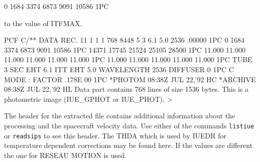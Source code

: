 \documentclass[11pt,twoside,nolof,noabs]{starlink}
\begin{document}
\begin{terminalv}
           0       1684       3374       6873       9091      10586   1PC
\end{terminalv}
to the value of ITFMAX.
\begin{terminalv}
 PCF C/** DATA REC. 11 1   1   1 768 8448 5 3  6.1  5.0 2536   .00000 1PC
           0       1684       3374       6873       9091      10586   1PC
       14371      17745      21524      25105      28500              1PC
      11.000     11.000     11.000     11.000     11.000     11.000   1PC
      11.000     11.000     11.000     11.000     11.000              1PC
 TUBE   3 SEC EHT  6.1 ITT EHT  5.0 WAVELENGTH 2536 DIFFUSER 0        1PC
      C     MODE : FACTOR   .178E 00                                  1PC
 *PHOTOM   08:38Z JUL 22,'92                                           HC
 *ARCHIVE   08:38Z JUL 22,'92                                          HL
 Data part contains 768 lines of size 1536 bytes.
 This is a photometric image (IUE_GPHOT or IUE_PHOT).
>
\end{terminalv}
The header for the extracted file contains additional information about the
processing and the spacecraft velocity data.
Use either of the commands \texttt{listiue} or \texttt{readsips} to see this header.
The THDA which is used by IUEDR for
temperature dependent corrections may be found here.
If the values are different the one for RESEAU MOTION is used.
\end{document}
